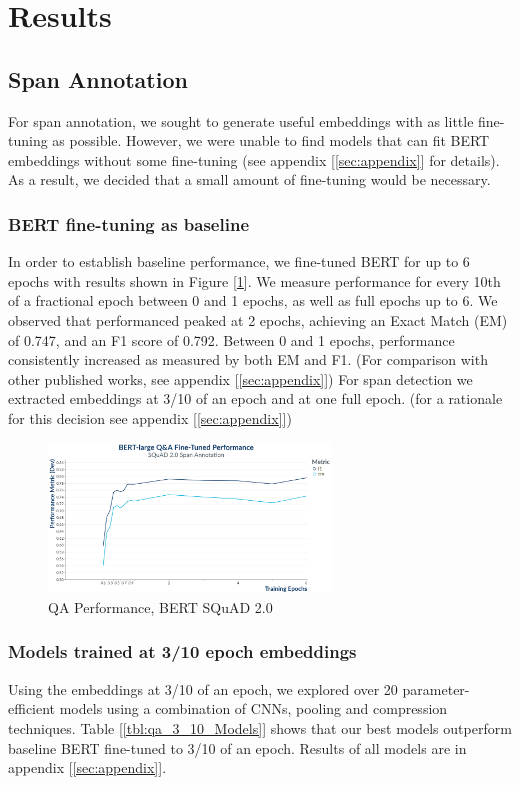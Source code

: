 \section{Results}

\subsection{Span Annotation}
For span annotation, we sought to generate useful embeddings with as little fine-tuning as possible. However, we were unable to find models that can fit BERT embeddings without some fine-tuning (see appendix [\ref{sec:appendix}] for details). As a result, we decided that a small amount of fine-tuning would be necessary.

\subsubsection{BERT fine-tuning as baseline}
In order to establish baseline performance, we fine-tuned BERT for up to 6 epochs with results shown in Figure [\ref{fig:QnABertPerformance}]. We measure performance for every 10th of a fractional epoch between 0 and 1 epochs, as well as full epochs up to 6. We observed that performanced peaked at 2 epochs, achieving an Exact Match (EM) of 0.747, and an F1 score of 0.792. Between 0 and 1 epochs, performance consistently increased as measured by  both EM and F1. (For comparison with other published works, see appendix [\ref{sec:appendix}]) For span detection we extracted embeddings at 3/10 of an epoch and at one full epoch. (for a rationale for this decision see appendix [\ref{sec:appendix}])
\begin{figure}[ht]
	\centering
	\includegraphics[width=7.5cm]{images/QnA_BERT_Training_Performance_plot.png}
	\caption{\label{fig:QnABertPerformance}QA Performance, BERT SQuAD 2.0}
\end{figure}

\subsubsection{Models trained at 3/10 epoch embeddings}
Using the embeddings at 3/10 of an epoch, we explored over 20 parameter-efficient models using a combination of CNNs, pooling and compression techniques.  Table [\ref{tbl:qa_3_10_Models}] shows that our best models outperform baseline BERT fine-tuned to 3/10 of an epoch. Results of all models are in appendix [\ref{sec:appendix}].

